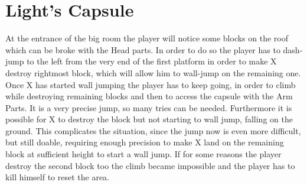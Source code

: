 \section{Light's Capsule}
At the entrance of the big room the player will notice some blocks on the roof which can be broke with the Head parts. In order to do so the player has to dash-jump to the left from the very end of the first platform in order to make X destroy rightmost block, which will allow him to wall-jump on the remaining one. Once X has started wall jumping the player has to keep going, in order to climb while destroying remaining blocks and then to access the capsule with the Arm Parts. It is a very precise jump, so many tries can be needed. Furthermore it is possible for X to destroy the block but not starting to wall jump, falling on the ground. This complicates the situation, since the jump now is even more difficult, but still doable, requiring enough precision to make X land on the remaining block at sufficient height to start a wall jump. If for some reasons the player destroy the second block too the climb became impossible and the player has to kill himself to reset the area.
